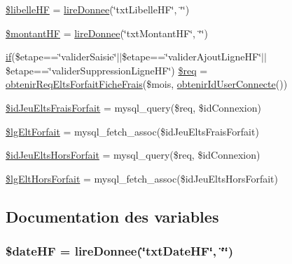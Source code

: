 \begin{DoxyCompactItemize}
\item 
\hyperlink{c_saisie_fiche_frais_8php_a5c651e0f3d29d0049ca4d2e5ad8db5da}{\$libelle\-H\-F} = \hyperlink{__utilitaires_et_gestion_erreurs_8lib_8php_ab4e61487d300e37e058c1fd31c0446a9}{lire\-Donnee}(\char`\"{}txt\-Libelle\-H\-F\char`\"{}, \char`\"{}\char`\"{})
\item 
\hyperlink{c_saisie_fiche_frais_8php_afb61cb595292a2af29810acbc2fde126}{\$montant\-H\-F} = \hyperlink{__utilitaires_et_gestion_erreurs_8lib_8php_ab4e61487d300e37e058c1fd31c0446a9}{lire\-Donnee}(\char`\"{}txt\-Montant\-H\-F\char`\"{}, \char`\"{}\char`\"{})
\item 
\hyperlink{c_se_connecter_8php_a161e098d41499c163a94c3fa5cd0e698}{if}(\$etape==\char`\"{}valider\-Saisie\char`\"{}$|$$|$\$etape==\char`\"{}valider\-Ajout\-Ligne\-H\-F\char`\"{}$|$$|$\$etape==\char`\"{}valider\-Suppression\-Ligne\-H\-F\char`\"{}) \hyperlink{c_saisie_fiche_frais_8php_a63a7a283ea5dee8af1e2d5a3435bf370}{\$req} = \hyperlink{__bd_gestion_donnees_8lib_8php_a8a9e576b89da1f4174e8730e2a66873b}{obtenir\-Req\-Elts\-Forfait\-Fiche\-Frais}(\$mois, \hyperlink{__gestion_session_8lib_8php_a7af627b049f30bda0af2678c3327aff0}{obtenir\-Id\-User\-Connecte}())
\item 
\hyperlink{c_saisie_fiche_frais_8php_a146da22ba279c9539211eb2c6c95fac2}{\$id\-Jeu\-Elts\-Frais\-Forfait} = mysql\-\_\-query(\$req, \$id\-Connexion)
\item 
\hyperlink{c_saisie_fiche_frais_8php_a022a86765b1e04a80ab0d4fdf39e85c5}{\$lg\-Elt\-Forfait} = mysql\-\_\-fetch\-\_\-assoc(\$id\-Jeu\-Elts\-Frais\-Forfait)
\item 
\hyperlink{c_saisie_fiche_frais_8php_a225816061d7d40976793178f909f3f2f}{\$id\-Jeu\-Elts\-Hors\-Forfait} = mysql\-\_\-query(\$req, \$id\-Connexion)
\item 
\hyperlink{c_saisie_fiche_frais_8php_aa394f8fa7752f4dc88580fee95a5489f}{\$lg\-Elt\-Hors\-Forfait} = mysql\-\_\-fetch\-\_\-assoc(\$id\-Jeu\-Elts\-Hors\-Forfait)
\end{DoxyCompactItemize}


\subsection{Documentation des variables}
\hypertarget{c_saisie_fiche_frais_8php_a6d93c38f9d39412ede016aff941c4476}{
\subsubsection[{\$date\-H\-F}]{\setlength{\rightskip}{0pt plus 5cm}\$date\-H\-F = {\bf lire\-Donnee}(\char`\"{}txt\-Date\-H\-F\char`\"{}, \char`\"{}\char`\"{})}}\label{c_saisie_fiche_frais_8php_a6d93c38f9d39412ede016aff941c4476}


